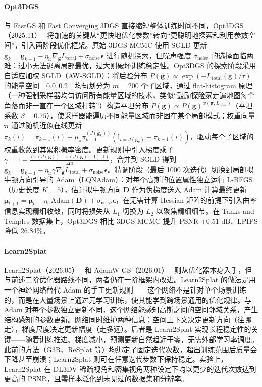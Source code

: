 \paragraph{Opt3DGS}
与 FastGS 和 Fast Converging 3DGS 直接缩短整体训练时间不同，Opt3DGS（2025.11）~\cite{2511_13571} 将加速的关键从``更快地优化参数''转向``更聪明地探索和利用参数空间''，引入两阶段优化框架。原始 3DGS-MCMC 使用 SGLD 更新 $\mathbf{g}_k = \mathbf{g}_{k-1} - \eta_{\text{lr}} \nabla_{\mathbf{g}} L_{\text{total}} + \sigma_{\text{noise}} \boldsymbol{\epsilon}$ 进行随机探索，但噪声强度 $\sigma_{\text{noise}}$ 的选择面临两难：过小无法逃离局部最优，过大则破坏训练稳定性。Opt3DGS 的探索阶段采用自适应加权 SGLD（AW-SGLD）：将后验分布 $P(\mathbf{g}) \propto \exp(-L_{\text{total}}(\mathbf{g})/\tau)$ 的能量空间 $[0.0, 0.2]$ 均匀划分为 $m{=}200$ 个子区域，通过 flat-histogram 原理（一种强制采样器均匀访问所有能量区域的技术，类似``鼓励探险家走遍地图每个角落而非一直在一个区域打转''）构造平坦分布 $\tilde{P}(\mathbf{g}) \propto P(\mathbf{g})^{w(\boldsymbol{\pi}, L_{\text{total}})}$（平坦系数 $\beta{=}0.75$），使采样器能遍历不同能量区域而非困在某个局部模式；权重向量 $\boldsymbol{\pi}$ 通过随机近似在线更新 $\pi_k(i) = \pi_{k-1}(i) + \mu_{\pi} \pi_{k-1}^{(J(\mathbf{g}_k))}(\mathbb{I}_{i = J(\mathbf{g}_k)} - \pi_{k-1}(i))$，驱动每个子区域的权重收敛到其累积概率密度。更新规则中引入梯度乘子 $\gamma = 1 + \frac{(\pi(J(\mathbf{g})) - \pi(J(\mathbf{g}){-}1) \cdot \mathbb{I})}{\Delta u}$，合并到 SGLD 得到 $\mathbf{g}_k = \mathbf{g}_{k-1} - \eta_{\text{lr}} \gamma \nabla_{\mathbf{g}} L_{\text{total}} + \sigma_{\text{noise}} \boldsymbol{\epsilon}$。精调阶段（最后 1000 次迭代）切换到局部拟牛顿方向引导的 Adam（LQNAdam）：对每个高斯的位置属性独立运行 L-BFGS（历史长度 $K{=}5$），估计拟牛顿方向 $\mathbf{D}$ 作为伪梯度送入 Adam 计算最终更新 $\boldsymbol{\mu}_{t+1} = \boldsymbol{\mu}_t - \eta_{\text{lr}} \text{Adam}(\mathbf{D}) + \sigma_{\text{noise}} \boldsymbol{\epsilon}$，在无需计算 Hessian 矩阵的前提下引入曲率信息实现精细收敛，同时将损失从 $L_1$ 切换为 $L_2$ 以聚焦精细细节。在 Tanks and Temples 数据集上，Opt3DGS 相比 3DGS-MCMC 提升 PSNR +0.51 dB、LPIPS 降低 26.84\%。

\paragraph{Learn2Splat}
Learn2Splat（2026.05）~\cite{2605_15760} 和 AdamW-GS（2026.01）~\cite{2601_16736} 则从优化器本身入手，但与前述二阶优化器路线不同，两者仍在一阶框架内改进。Learn2Splat 的做法是用一个神经网络替代 Adam 的手工更新规则——这个网络不是针对单个场景训练的，而是在大量场景上通过元学习训练，使其能学到跨场景通用的优化规律。与 Adam 对每个参数独立更新不同，这个网络能感知高斯之间的空间邻域关系，产生结构感知的参数更新。网络同时维护两种信息：空间上下文决定更新方向（往哪走），梯度尺度决定更新幅度（走多远）。后者是 Learn2Splat 实现长程稳定性的关键——随着训练推进、梯度减小，预测更新自然趋近于零，无需外部学习率调度。此前的方法（G3R、ReSplat 等）均绑定了固定迭代次数，超出训练范围后质量会下降甚至崩溃；Learn2Splat 则可在任意迭代步数下保持稳定。实验上，Learn2Splat 在 DL3DV 稀疏视角和密集视角两种设定下均以更少的迭代次数达到更高的 PSNR，且零样本泛化到未见过的数据集和分辨率。

